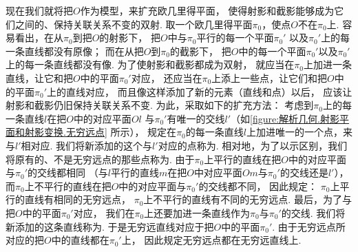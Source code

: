 现在我们就将把\(O\)作为模型，来扩充欧几里得平面，
使得射影和截影能够成为它们之间的、保持关联关系不变的双射.
取一个欧几里得平面\(\pi_0\)，使点\(O\)不在\(\pi_0\)上.
容易看出，在从\(\pi_0\)到把\(O\)的射影下，
把\(O\)中与\(\pi_0\)平行的每一个平面\(\pi_0'\)
以及\(\pi_0'\)上的每一条直线都没有原像；
而在从把\(O\)到\(\pi_0\)的截影下，
把\(O\)中的每一个平面\(\pi_0'\)以及\(\pi_0'\)上的每一条直线都没有像.
为了使射影和截影都成为双射，
就应当在\(\pi_0\)上加进一条直线，让它和把\(O\)中的平面\(\pi_0'\)对应，
还应当在\(\pi_0\)上添上一些点，让它们和把\(O\)中的平面\(\pi_0'\)上的直线对应，
而且像这样添加了新的元素（直线和点）以后，
应该让射影和截影仍旧保持关联关系不变.
为此，采取如下的扩充方法：
考虑到\(\pi_0\)上的每一条直线\(l\)在把\(O\)中的对应平面\(Ol\)
与\(\pi_0'\)有唯一的交线\(l'\)（如\cref{figure:解析几何.射影平面和射影变换.无穷远点} 所示），
规定在\(\pi_0\)的每一条直线\(l\)上加进唯一的一个点，来与\(l'\)相对应.
我们将新添加的这个与\(l'\)对应的点称为.
相对地，为了以示区别，我们将原有的、不是无穷远点的那些点称为.
由于\(\pi_0\)上平行的直线在把\(O\)中的对应平面与\(\pi_0'\)的交线都相同
（与\(l\)平行的直线\(m\)在把\(O\)中对应平面\(Om\)与\(\pi_0'\)的交线还是\(l'\)），
而\(\pi_0\)上不平行的直线在把\(O\)中的对应平面与\(\pi_0'\)的交线都不同，
因此规定：
\(\pi_0\)上平行的直线有相同的无穷远点，
\(\pi_0\)上不平行的直线有不同的无穷远点.
最后，为了与把\(O\)中的平面\(\pi_0'\)对应，
我们在\(\pi_0\)上还要加进一条直线作为\(\pi_0\)与\(\pi_0'\)的交线.
我们将新添加的这条直线称为.
于是无穷远直线对应于把\(O\)中的平面\(\pi_0'\).
由于无穷远点所对应的把\(O\)中的直线都在\(\pi_0'\)上，
因此规定无穷远点都在无穷远直线上.

